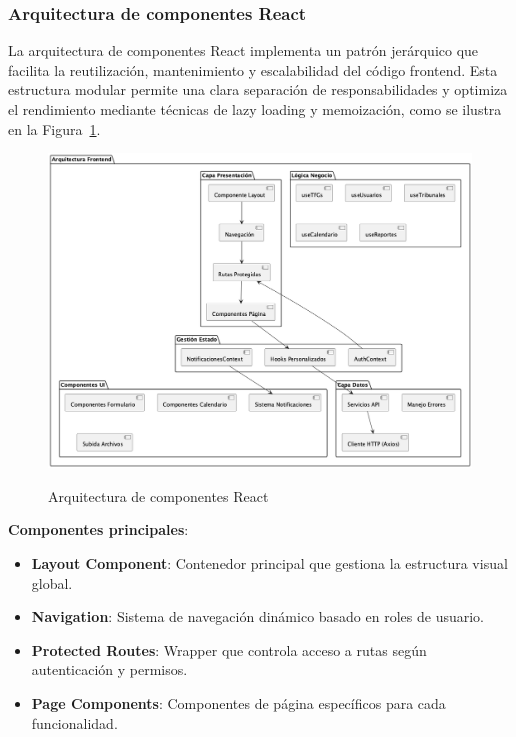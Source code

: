 \documentclass[12pt,a4paper,oneside]{report}
\providecommand{\tightlist}{%
  \setlength{\itemsep}{0pt}\setlength{\parskip}{0pt}}
\providecommand{\pandocbounded}[1]{#1}
\begin{document}
\subsubsection{Arquitectura de componentes
React}\label{arquitectura-de-componentes-react}

La arquitectura de componentes React implementa un patrón jerárquico que facilita la reutilización, mantenimiento y escalabilidad del código frontend. Esta estructura modular permite una clara separación de responsabilidades y optimiza el rendimiento mediante técnicas de lazy loading y memoización, como se ilustra en la Figura~\ref{fig:arquitectura-componentes-react}.

\begin{figure}[H]
\centering
\pandocbounded{\includegraphics[keepaspectratio,alt={Arquitectura de componentes React}]{processed/images/05_diseno_plantuml_0.png}}
\caption{Arquitectura de componentes React}
\label{fig:arquitectura-componentes-react}
\end{figure}

\textbf{Componentes principales}:

\begin{itemize}
\tightlist
\item
  \textbf{Layout Component}: Contenedor principal que gestiona la
  estructura visual global.
\item
  \textbf{Navigation}: Sistema de navegación dinámico basado en roles de
  usuario.
\item
  \textbf{Protected Routes}: Wrapper que controla acceso a rutas según
  autenticación y permisos.
\item
  \textbf{Page Components}: Componentes de página específicos para cada
  funcionalidad.
\end{itemize}
\end{document}
